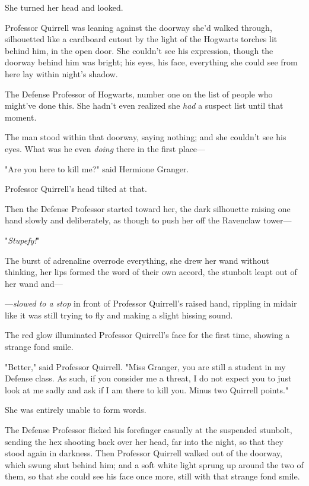 She turned her head and looked.

Professor Quirrell was leaning against the doorway she'd walked through,
silhouetted like a cardboard cutout by the light of the Hogwarts torches lit
behind him, in the open door. She couldn't see his expression, though the
doorway behind him was bright; his eyes, his face, everything she could see
from here lay within night's shadow.

The Defense Professor of Hogwarts, number one on the list of people who
might've done this. She hadn't even realized she \emph{had} a suspect list
until that moment.

The man stood within that doorway, saying nothing; and she couldn't see his
eyes. What was he even \emph{doing} there in the first place---

"Are you here to kill me?" said Hermione Granger.

Professor Quirrell's head tilted at that.

Then the Defense Professor started toward her, the dark silhouette raising one
hand slowly and deliberately, as though to push her off the Ravenclaw tower---

"\emph{Stupefy!}"

The burst of adrenaline overrode everything, she drew her wand without
thinking, her lips formed the word of their own accord, the stunbolt leapt out
of her wand and---

---\emph{slowed to a stop} in front of Professor Quirrell's raised hand,
rippling in midair like it was still trying to fly and making a slight hissing
sound.

The red glow illuminated Professor Quirrell's face for the first time, showing
a strange fond smile.

"Better," said Professor Quirrell. "Miss Granger, you are still a student in my
Defense class. As such, if you consider me a threat, I do not expect you to
just look at me sadly and ask if I am there to kill you. Minus two Quirrell
points."

She was entirely unable to form words.

The Defense Professor flicked his forefinger casually at the suspended
stunbolt, sending the hex shooting back over her head, far into the night, so
that they stood again in darkness. Then Professor Quirrell walked out of the
doorway, which swung shut behind him; and a soft white light sprung up around
the two of them, so that she could see his face once more, still with that
strange fond smile.

